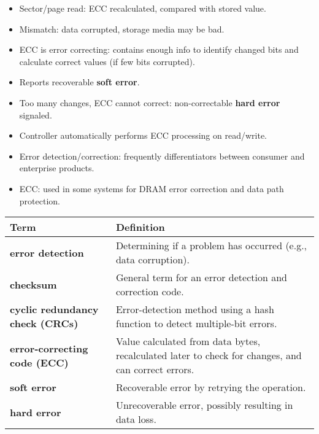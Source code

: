 \begin{itemize}
    \item Sector/page read: ECC recalculated, compared with stored value.
    \item Mismatch: data corrupted, storage media may be bad.
    \item ECC is error correcting: contains enough info to identify changed bits and calculate correct values (if few bits corrupted).
    \item Reports recoverable \textbf{soft error}.
    \item Too many changes, ECC cannot correct: non-correctable \textbf{hard error} signaled.
    \item Controller automatically performs ECC processing on read/write.
    \item Error detection/correction: frequently differentiators between consumer and enterprise products.
    \item ECC: used in some systems for DRAM error correction and data path protection.
\end{itemize}

\vspace{1em}
\begin{tabular}{p{}p{}}
\toprule
\rowcolor{lightgray} \textbf{Term} & \textbf{Definition} \\
\midrule
\textbf{error detection} & Determining if a problem has occurred (e.g., data corruption). \\
\textbf{checksum} & General term for an error detection and correction code. \\
\textbf{cyclic redundancy check (CRCs)} & Error-detection method using a hash function to detect multiple-bit errors. \\
\textbf{error-correcting code (ECC)} & Value calculated from data bytes, recalculated later to check for changes, and can correct errors. \\
\textbf{soft error} & Recoverable error by retrying the operation. \\
\textbf{hard error} & Unrecoverable error, possibly resulting in data loss. \\
\bottomrule
\end{tabular}
